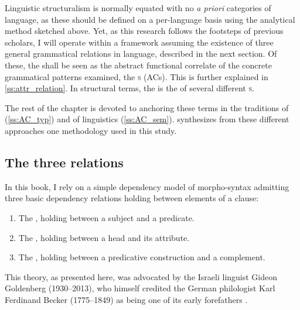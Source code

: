 Linguistic structuralism is normally equated with no \textit{a priori} categories of language, as these should be defined on a per-language basis using the analytical method sketched above. Yet,  as this research follows the footsteps of previous scholars, I will operate within a framework assuming the existence of three general grammatical relations in language, described in the next section. Of these, the  shall be seen as the abstract functional correlate of the concrete grammatical patterns examined, the \textsc{s} (ACs). This is further explained in \ref{ss:attr_relation}. In structural terms, the  is the  
of several different \textsc{s}. 

The rest of the chapter is devoted to anchoring these terms in the traditions of  (\ref*{ss:AC_typ}) and of  linguistics  (\ref*{ss:AC_sem}).  synthesizes from these different approaches one methodology used in this study. 

\subsection{The three relations} \label{ss:threeRel}

In this book, I rely on a simple dependency model of morpho-syntax admitting three basic dependency relations holding between elements of a clause: 

\begin{enumerate}
\item The , holding between a subject and a predicate.

\item The , holding between a head and its attribute.

\item The , holding between a predicative construction and a complement.
\end{enumerate}

This theory, as presented here, was advocated by the Israeli linguist Gideon Goldenberg (1930--2013), who himself credited the German philologist Karl Ferdinand Becker (1775–1849) as being one of its early forefathers \parencites(see)()[10]{BeckerGrammar}{GoldenbergRelations}[Ch.\ 11]{GoldenbergSemitic}[37--38]{CohenSha}{GutmanReview}. 

